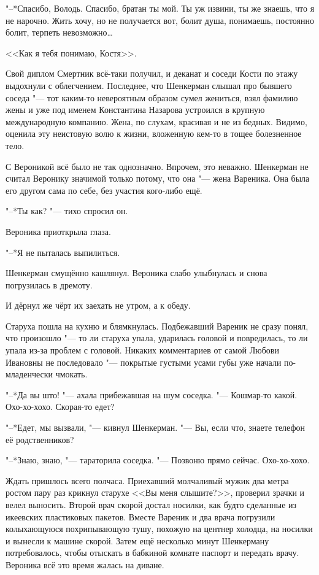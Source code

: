 "--*Спасибо, Володь.
Спасибо, братан ты мой.
Ты уж извини, ты же знаешь, что я не нарочно.
Жить хочу, но не получается вот, болит душа, понимаешь, постоянно болит, терпеть невозможно\ldots{}

<<Как я тебя понимаю, Костя>>.

Свой диплом Смертник всё-таки получил, и деканат и соседи Кости по этажу выдохнули с облегчением.
Последнее, что Шенкерман слышал про бывшего соседа "--- тот каким-то невероятным образом сумел жениться, взял фамилию жены и уже под именем Константина Назарова устроился в крупную международную компанию.
Жена, по слухам, красивая и не из бедных.
Видимо, оценила эту неистовую волю к жизни, вложенную кем-то в тощее болезненное тело.

С Вероникой всё было не так однозначно.
Впрочем, это неважно.
Шенкерман не считал Веронику значимой только потому, что она "--- жена Вареника.
Она была его другом сама по себе, без участия кого-либо ещё.

"--*Ты как? "--- тихо спросил он.

Вероника приоткрыла глаза.

"--*Я не пыталась выпилиться.

Шенкерман смущённо кашлянул.
Вероника слабо улыбнулась и снова погрузилась в дремоту.

\asterism

И дёрнул же чёрт их заехать не утром, а к обеду.

Старуха пошла на кухню и блямкнулась.
Подбежавший Вареник не сразу понял, что произошло "--- то ли старуха упала, ударилась головой и повредилась, то ли упала из-за проблем с головой.
Никаких комментариев от самой Любови Ивановны не последовало "--- покрытые густыми усами губы уже начали по-младенчески чмокать.

"--*Да вы што! "--- ахала прибежавшая на шум соседка.
"--- Кошмар-то какой.
Охо-хо-хохо.
Скорая-то едет?

"--*Едет, мы вызвали, "--- кивнул Шенкерман.
"--- Вы, если что, знаете телефон её родственников?

"--*Знаю, знаю, "--- тараторила соседка.
"--- Позвоню прямо сейчас.
Охо-хо-хохо.

Ждать пришлось всего полчаса.
Приехавший молчаливый мужик два метра ростом пару раз крикнул старухе <<Вы меня слышите?>>, проверил зрачки и велел выносить.
Второй врач скорой достал носилки, как будто сделанные из икеевских пластиковых пакетов.
Вместе Вареник и два врача погрузили колыхающуюся похрипывающую тушу, похожую на центнер холодца, на носилки и вынесли к машине скорой.
Затем ещё несколько минут Шенкерману потребовалось, чтобы отыскать в бабкиной комнате паспорт и передать врачу.
Вероника всё это время жалась на диване.

